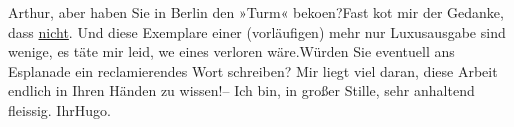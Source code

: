 \pstart
           Arthur, aber haben Sie in Berlin den »Turm« beko{\geminationm}en?\hspace*{1.5em}Fast ko{\geminationm}t mir der Gedanke,
               dass \uline{nicht}. Und diese Exemplare einer (vorläufigen)
               mehr nur Luxusausgabe sind wenige, es täte mir leid, we{\geminationn}
               eines verloren wäre.\hspace*{1.5em}Würden Sie eventuell ans Esplanade ein reclamierendes Wort schreiben? Mir
               liegt viel daran, diese Arbeit endlich in Ihren Händen zu wissen!\hspace*{1.5em}– Ich bin, in großer Stille, sehr anhaltend fleissig.\pend
           \pstart Ihr\spacefill\mbox{Hugo.}\pend{}\endnumbering{}  \newcommand{\dateiname}{L02454}\newcommand{\titel}{Hugo Hofmannsthal an Arthur Schnitzler, 14. 11. 1925}\newcommand{\editorInnen}{Martin Anton Müller und Gerd-Hermann Susen}
